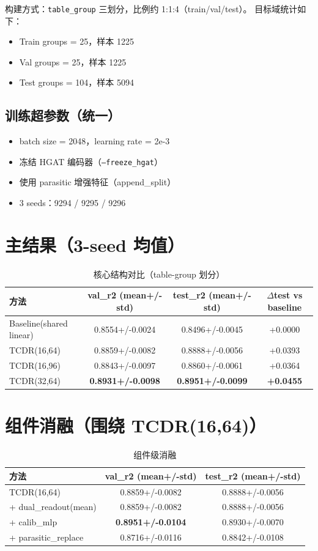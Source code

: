 \documentclass[12pt,a4paper]{ctexart}
\begin{document}
构建方式：\texttt{table\_group} 三划分，比例约 1:1:4（train/val/test）。
目标域统计如下：
\begin{itemize}
  \item Train groups = 25，样本 1225
  \item Val groups = 25，样本 1225
  \item Test groups = 104，样本 5094
\end{itemize}

\subsection{训练超参数（统一）}
\begin{itemize}
  \item batch size = 2048，learning rate = 2e-3
  \item 冻结 HGAT 编码器（\texttt{--freeze\_hgat}）
  \item 使用 parasitic 增强特征（append\_split）
  \item 3 seeds：9294 / 9295 / 9296
\end{itemize}

\section{主结果（3-seed 均值）}
\begin{table}[htbp]
\centering
\small
\setlength{\tabcolsep}{4pt}
\begin{tabular}{lccc}
\toprule
方法 & val\_r2 (mean+/-std) & test\_r2 (mean+/-std) & $\Delta$test vs baseline \\
\midrule
Baseline(shared linear) & 0.8554+/-0.0024 & 0.8496+/-0.0045 & +0.0000 \\
TCDR(16,64) & 0.8859+/-0.0082 & 0.8888+/-0.0056 & +0.0393 \\
TCDR(16,96) & 0.8843+/-0.0097 & 0.8860+/-0.0061 & +0.0364 \\
TCDR(32,64) & \textbf{0.8931+/-0.0098} & \textbf{0.8951+/-0.0099} & \textbf{+0.0455} \\
\bottomrule
\end{tabular}
\caption{核心结构对比（table-group 划分）}
\end{table}

\section{组件消融（围绕 TCDR(16,64)）}
\begin{table}[htbp]
\centering
\small
\setlength{\tabcolsep}{4pt}
\begin{tabular}{lcc}
\toprule
方法 & val\_r2 (mean+/-std) & test\_r2 (mean+/-std) \\
\midrule
TCDR(16,64) & 0.8859+/-0.0082 & 0.8888+/-0.0056 \\
+ dual\_readout(mean) & 0.8859+/-0.0082 & 0.8888+/-0.0056 \\
+ calib\_mlp & \textbf{0.8951+/-0.0104} & 0.8930+/-0.0070 \\
+ parasitic\_replace & 0.8716+/-0.0116 & 0.8842+/-0.0108 \\
\bottomrule
\end{tabular}
\caption{组件级消融}
\end{table}
\end{document}
